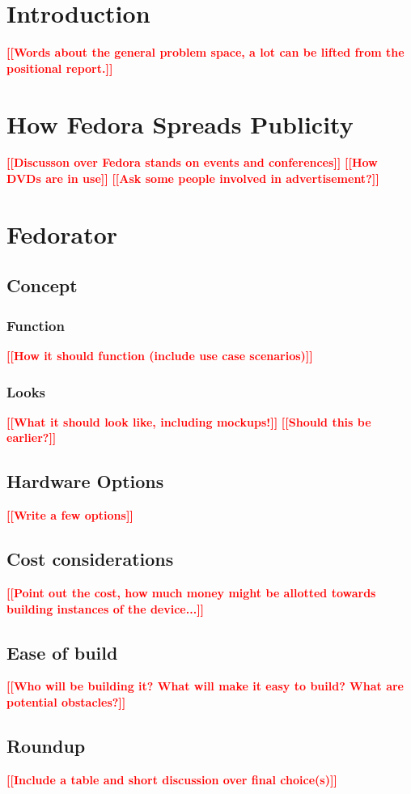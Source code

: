 \documentclass[thesis=B,english,hidelinks]{template/FITthesisXE}
\newcommand{\todo}[1]{\textcolor{red}{\textbf{[[#1]]}}}
\newcommand{\blind}[1][1]{\textcolor{gray}{\Blindtext[#1][1]}}
\begin{document}
\chapter{Introduction}
    \todo{Words about the general problem space, a lot can be lifted from the positional report.}
    \blind[2]
\chapter{How Fedora Spreads Publicity}
    \todo{Discusson over Fedora stands on events and conferences}
    \todo{How DVDs are in use}
    \todo{Ask some people involved in advertisement?}
    \blind[3]
\chapter{Fedorator}
    \section{Concept}
        \subsection{Function}
            \todo{How it should function (include use case scenarios)}
            \blind[3]
        \subsection{Looks}
            \todo{What it should look like, including mockups!}
            \todo{Should this be earlier?}
            \blind[3]
    \section{Hardware Options}
        \todo{Write a few options}
        \blind[4]
    \section{Cost considerations}
        \todo{Point out the cost, how much money might be allotted towards building instances of the device...}
        \blind[2]
    \section{Ease of build}
        \todo{Who will be building it?  What will make it easy to build?  What are potential obstacles?}
        \blind[2]
    \section{Roundup}
        \todo{Include a table and short discussion over final choice(s)}
        \blind[2]
\end{document}
